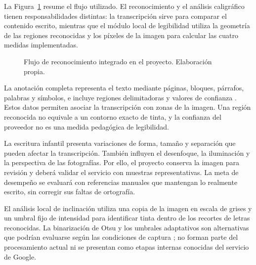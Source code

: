 La Figura~\ref{fig:OCR} resume el flujo utilizado. El reconocimiento y el análisis caligráfico tienen responsabilidades distintas: la transcripción sirve para comparar el contenido escrito, mientras que el módulo local de legibilidad utiliza la geometría de las regiones reconocidas y los píxeles de la imagen para calcular las cuatro medidas implementadas.
\begin{figure}[H]
\centering
{}
\caption{Flujo de reconocimiento integrado en el proyecto. Elaboración propia.}
\label{fig:OCR}
\end{figure}

La anotación completa representa el texto mediante páginas, bloques, párrafos, palabras y símbolos, e incluye regiones delimitadoras y valores de confianza \cite{googlevisionAnnotation}. Estos datos permiten asociar la transcripción con zonas de la imagen. Una región reconocida no equivale a un contorno exacto de tinta, y la confianza del proveedor no es una medida pedagógica de legibilidad.

La escritura infantil presenta variaciones de forma, tamaño y separación que pueden afectar la transcripción. También influyen el desenfoque, la iluminación y la perspectiva de las fotografías. Por ello, el proyecto conserva la imagen para revisión y deberá validar el servicio con muestras representativas. La meta de desempeño se evaluará con referencias manuales que mantengan lo realmente escrito, sin corregir sus faltas de ortografía.

El análisis local de inclinación utiliza una copia de la imagen en escala de grises y un umbral fijo de intensidad para identificar tinta dentro de los recortes de letras reconocidas. La binarización de Otsu y los umbrales adaptativos son alternativas que podrían evaluarse según las condiciones de captura \cite{otsu1979threshold,opencvMetricas}; no forman parte del procesamiento actual ni se presentan como etapas internas conocidas del servicio de Google.


